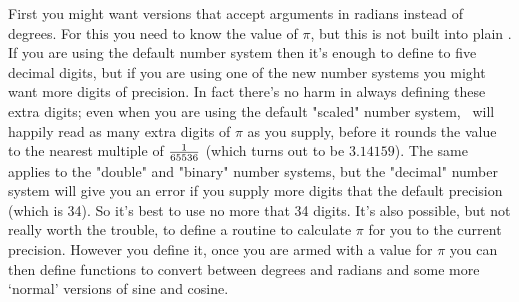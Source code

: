 \documentclass[a4paper,landscape]{article}
\begin{document}
First you might want versions that accept arguments in radians instead of degrees.
For this you need to know the value of $\pi$, but this is not built into plain \MP.
If you are using the default number system then it's enough to define to five
decimal digits,%
but if you are using one of the new number systems you might want more digits of
precision.  In fact there's no harm in always defining these extra digits; even when
you are using the default "scaled" number system, \MP\ will happily read as many
extra digits of $\pi$ as you supply, before it rounds the value to the nearest
multiple of $1\over65536$ (which turns out to be $3.14159$). The same applies to the
"double" and "binary" number systems, but the "decimal" number system will give you
an error if you supply more digits that the default precision (which is 34).  So
it's best to use no more that 34 digits.  It's also possible, but not really worth
the trouble, to define a routine to calculate $\pi$ for you to the current
precision.  However you define it, once you are armed with a value for $\pi$ you can
then define functions to convert between degrees and radians and some more `normal'
versions of sine and cosine.
\end{document}

